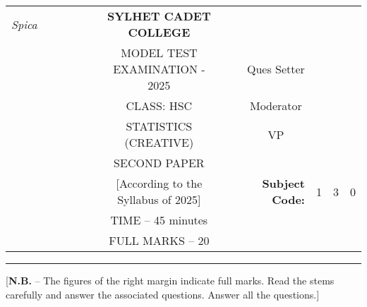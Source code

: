 \documentclass[12pt]{article}
\begin{document}
\begin{table}[h]
\begin{tabular}{llllllcllrlll}
\textit{Spica} &  &  &  &  &  & \textbf{SYLHET CADET COLLEGE}       &  &                       & \multicolumn{1}{l}{}                        &                        &                        &                        \\ \cline{10-13} 
                 &  &  &  &  &  & MODEL TEST EXAMINATION - 2025             &  & \multicolumn{1}{l|}{} & \multicolumn{1}{c|}{Ques Setter}            & \multicolumn{3}{l|}{}                                                    \\ \cline{10-13} 
                 &  &  &  &  &  & CLASS: HSC                          &  & \multicolumn{1}{l|}{} & \multicolumn{1}{c|}{Moderator}              & \multicolumn{3}{l|}{}                                                    \\ \cline{10-13} 
                 &  &  &  &  &  & STATISTICS (CREATIVE)               &  & \multicolumn{1}{l|}{} & \multicolumn{1}{c|}{VP}                     & \multicolumn{3}{l|}{}                                                    \\ \cline{10-13} 
                 &  &  &  &  &  & SECOND PAPER                        &  &                       &                                             &                        &                        &                        \\ \cline{11-13} 
                 &  &  &  &  &  & [According to the Syllabus of 2025] &  &                       & \multicolumn{1}{r|}{\textbf{Subject Code:}} & \multicolumn{1}{l|}{1} & \multicolumn{1}{l|}{3} & \multicolumn{1}{l|}{0} \\ \cline{11-13} 
                 &  &  &  &  &  & TIME –  45 minutes        &  &                       &                                             &                        &                        &                        \\
                 &  &  &  &  &  & FULL MARKS – 20                     &  &                       & \textbf{}                                   &                        &                        &                       
\end{tabular}
\end{table}

\hrule

\begin{center}
[\textbf{N.B.} – The figures of the right margin indicate full marks. Read the stems carefully and answer the associated questions. Answer all the questions.]\\
\end{center}
\end{document}
